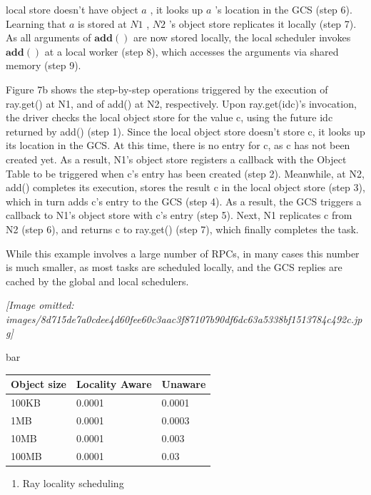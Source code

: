 \documentclass[
]{article}
\newcounter{none} %
\providecommand{\tightlist}{%
  \setlength{\itemsep}{0pt}\setlength{\parskip}{0pt}}
\begin{document}
local store doesn't have object \(a\) , it looks up \(a\) 's location in
the GCS (step 6). Learning that \(a\) is stored at \(N1\) , \(N2\) 's
object store replicates it locally (step 7). As all arguments of
\(\mathbf{add}()\) are now stored locally, the local scheduler invokes
\(\mathbf{add}()\) at a local worker (step 8), which accesses the
arguments via shared memory (step 9).

Figure 7b shows the step-by-step operations triggered by the execution
of ray.get() at N1, and of add() at N2, respectively. Upon
ray.get(idc)'s invocation, the driver checks the local object store for
the value c, using the future idc returned by add() (step 1). Since the
local object store doesn't store c, it looks up its location in the GCS.
At this time, there is no entry for c, as c has not been created yet. As
a result, N1's object store registers a callback with the Object Table
to be triggered when c's entry has been created (step 2). Meanwhile, at
N2, add() completes its execution, stores the result c in the local
object store (step 3), which in turn adds c's entry to the GCS (step 4).
As a result, the GCS triggers a callback to N1's object store with c's
entry (step 5). Next, N1 replicates c from N2 (step 6), and returns c to
ray.get() (step 7), which finally completes the task.

While this example involves a large number of RPCs, in many cases this
number is much smaller, as most tasks are scheduled locally, and the GCS
replies are cached by the global and local schedulers.

\textit{[Image omitted: images/8d715de7a0cdee4d60fee60c3aac3f87107b90df6dc63a5338bf1513784c492c.jpg]}

bar

{\def\LTcaptype{none} %
\begin{longtable}[]{@{}lll@{}}
\toprule\noalign{}
Object size & Locality Aware & Unaware \\
\midrule\noalign{}
\endhead
\bottomrule\noalign{}
\endlastfoot
100KB & 0.0001 & 0.0001 \\
1MB & 0.0001 & 0.0003 \\
10MB & 0.0001 & 0.003 \\
100MB & 0.0001 & 0.03 \\
\end{longtable}
}

\begin{enumerate}
\def\labelenumi{(\alph{enumi})}
\tightlist
\item
  Ray locality scheduling
\end{enumerate}
\end{document}
